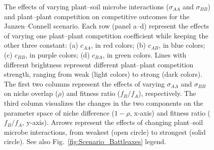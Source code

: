 \clearpage
\begin{figure}[htbp]
	\centering
	\caption[The effects of varying plant--soil microbe interactions ($\sigma_{AA}$ and $\sigma_{BB}$) and plant--plant competition on competitive outcomes for the Janzen--Connell scenario.]
		{The effects of varying plant--soil microbe interactions ($\sigma_{AA}$ and $\sigma_{BB}$) and plant--plant competition on competitive outcomes for the Janzen--Connell scenario.
		Each row (panel a--d) represent the effects of varying one plant--plant competition coefficient while keeping the other three constant: (a) $c_{AA}$, in red colors; (b) $c_{AB}$, in blue colors; (c) $c_{BB}$, in purple colors; (d) $c_{BA}$, in green colors. Lines with different brightness represent different plant--plant competition strength, ranging from weak (light colors) to strong (dark colors).
		The first two columns represent the effects of varying $\sigma_{AA}$ and $\sigma_{BB}$ on niche overlap ($\rho$) and fitness ratio ($f_{B}/f_{A}$), respectively. The third column visualizes the changes in the two components on the parameter space of niche difference ($1 - \rho$, x-axis) and fitness ratio ($f_{B}/f_{A}$, y-axis). Arrows represent the effects of changing plant--soil microbe interactions, from weakest (open circle) to strongest (solid circle). See also Fig.~\ref{fig:Scenario_Battleaxes} legend.} 
	\label{fig:Janzen_Connell_everything}
\end{figure}



